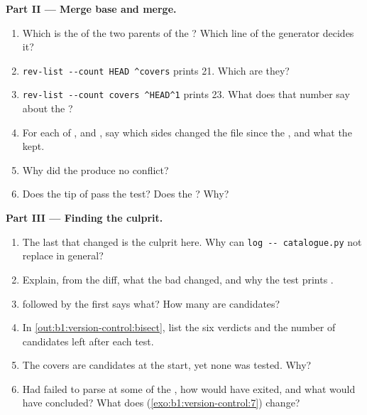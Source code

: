 \begin{problem}
\medskip\noindent\textbf{Part II --- Merge base and merge.}
\begin{enumerate}[resume]
\item Which  is the  of the two parents of the ? Which line of the generator decides it?
\item \texttt{rev-{}list -{}-{}count HEAD \textasciicircum{}covers} prints 21. Which  are they?
\item \texttt{rev-{}list -{}-{}count covers \textasciicircum{}HEAD\textasciicircum{}1} prints 23. What does that number say about the ?
\item For each of ,  and , say which sides changed the file since the
, and what the  kept.
\item Why did the  produce no conflict?
\item Does the tip of  pass the test? Does the ? Why?
\end{enumerate}

\medskip\noindent\textbf{Part III --- Finding the culprit.}
\begin{enumerate}[resume]
\item The last  that changed  is the culprit here. Why can \texttt{log -{}-{} catalogue.py} not
replace  in general?
\item Explain, from the diff, what the bad  changed, and why the test prints .
\item {} followed by the first  says what? How many  are candidates?
\item In \cref{out:b1:version-control:bisect}, list the six verdicts and the number of candidates left after each test.
\item The covers  are candidates at the start, yet none was tested. Why?
\item Had  failed to parse at some  of the , how would  have exited, and
what would  have concluded? What does  (\cref{exo:b1:version-control:7}) change?
\end{enumerate}


\end{problem}
